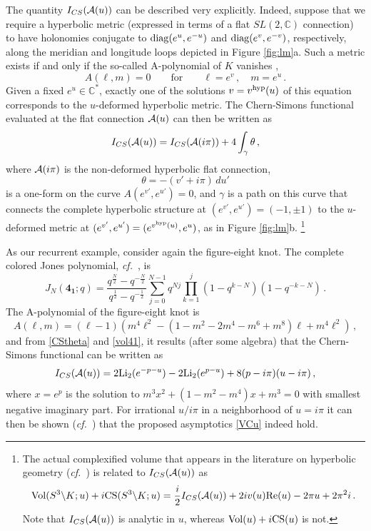 \documentclass[letterpaper,12pt]{article}
\numberwithin{equation}{section}
\newcommand{\mb}{\mathbf}
\newcommand{\cf}{\emph{cf.}}
\newcommand{\be}{\begin{equation}}
\newcommand{\ee}{\end{equation}}
\renewcommand{\Re}{{\rm Re}}
\newcommand{\Vol}{{\rm Vol}}
\newcommand{\CS}{{\rm CS}}
\newcommand{\Li}{{\rm Li}}
\newcommand{\bs}{\backslash}
\newcommand{\C}{{\mathbb{C}}}
\newcommand{\diag}{{\rm diag}}
\newcommand{\CA}{{\cal A}}
\renewcommand{\=}{\;=\;}
\begin{document}
The quantity $I_{CS}(\CA(u))$ can be described very explicitly. Indeed, suppose that we require a hyperbolic metric (expressed in terms of a flat $SL(2,\C)$ connection) to have holonomies conjugate to $\diag(e^u,e^{-u})$ and $\diag(e^v,e^{-v})$, respectively, along the meridian and longitude loops depicted in Figure \ref{fig:lm}a. Such a metric exists if and only if the so-called A-polynomial of $K$ vanishes \cite{cooper-1994},
%
\be A(\ell,m) = 0 \qquad\text{for}\qquad \ell=e^v\,,\quad m=e^u\,. \label{A} \ee
%
Given a fixed $e^{u}\in\C^*$, exactly one of the solutions $v=v^{\rm hyp}(u)$ of this equation corresponds to the $u$-deformed hyperbolic metric.
The Chern-Simons functional evaluated at the flat connection $\CA(u)$ can then be written as
%
\be I_{CS}(\CA(u)) = I_{CS}(\CA(i\pi)) +4 \int_\gamma \theta\,, \label{CStheta} \ee
%
where $\CA(i\pi)$ is the non-deformed hyperbolic flat connection,
%
\be \theta = -(v'+i\pi)\,du' \ee
%
is a one-form on the curve $A(e^{v'},e^{u'})=0$, and $\gamma$ is a path on this curve that connects the complete hyperbolic structure at $(e^{v'},e^{u'})=(-1,\pm1)$ to the $u$-deformed metric at $(e^{v'},e^{u'})=(e^{v^{\rm hyp}(u)},e^u)$, as in Figure \ref{fig:lm}b.%
%
\footnote{The actual complexified volume that appears in the literature on hyperbolic geometry (\cf\ \cite{NZ, yoshida-1985, Hilden-1996}) is related to $I_{CS}(\CA(u))$ as
%
\be \Vol(S^3\bs K;u)+i\CS(S^3\bs K;u) = \frac{i}{2}I_{CS}(\CA(u)) + 2iv(u)\Re(u)-2\pi u+2\pi^2 i\,.
\ee
%
Note that $I_{CS}(\CA(u))$ is analytic in $u$, whereas $\Vol(u)+i\CS(u)$ is not.}




As our recurrent example, consider again the figure-eight knot. The complete colored Jones polynomial, \cf\ \cite{Habiro-Jones}, is
%
\be J_N(\mb{4_1};q) = \frac{q^{\frac N 2}-q^{-\frac N 2}}{q^\frac12-q^{-\frac12}}\sum_{j=0}^{N-1}q^{Nj}\prod_{k=1}^j(1-q^{k-N})(1-q^{-k-N})\,. \ee
%
The A-polynomial of the figure-eight knot is
%
\be A(\ell,m) = (\ell-1)(m^4\ell^2-(1-m^2-2m^4-m^6+m^8)\ell+m^4\ell^2)\,,\ee
%
and from \eqref{CStheta} and \eqref{vol41}, it results (after some algebra) that the Chern-Simons functional can be written as
%
\be I_{CS}(\CA(u)) = 2\Li_2(e^{-p-u})-2\Li_2(e^{p-u})+8(p-i\pi)(u-i\pi)\,, \ee
%
where $x=e^p$ is the solution to $m^3x^2+(1-m^2-m^4)x+m^3=0$ with smallest negative imaginary part.
For irrational $u/ i\pi$ in a neighborhood of $u=i\pi$ it can then be shown (\cf\ \cite{Mur-parametrized, Mur-Yok}) that the proposed asymptotics \eqref{VCu} indeed hold. \\
\end{document}

